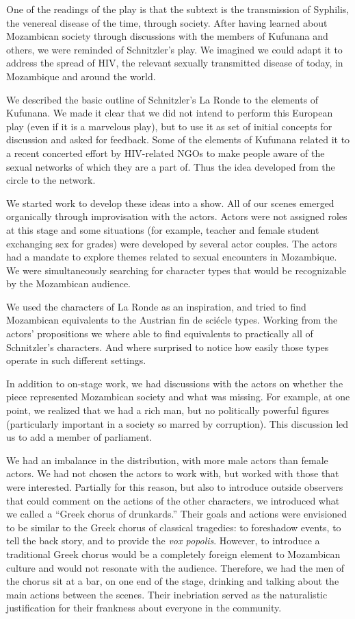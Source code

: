 \documentclass[article,twocolumn]{memoir}
\begin{document}
One of the readings of the play is that the subtext is the transmission of
Syphilis, the venereal disease of the time, through society. After having
learned about Mozambican society through discussions with the members of
Kufunana and others, we were reminded of Schnitzler's play. We imagined we
could adapt it to address the spread of HIV, the relevant sexually transmitted
disease of today, in Mozambique and around the world.

We described the basic outline of Schnitzler's La Ronde to the elements of
Kufunana. We made it clear that we did not intend to perform this European play
(even if it is a marvelous play), but to use it as set of initial concepts for
discussion and asked for feedback. Some of the elements of Kufunana related it
to a recent concerted effort by HIV-related NGOs to make people aware of the
sexual networks of which they are a part of. Thus the idea developed from the
circle to the network.

We started work to develop these ideas into a show. All of our scenes emerged
organically through improvisation with the actors. Actors were not assigned
roles at this stage and some situations (for example, teacher and female student
exchanging sex for grades) were developed by several actor couples. The actors
had a mandate to explore themes related to sexual encounters in Mozambique. We
were simultaneously searching for character types that would be recognizable
by the Mozambican audience.

We used the characters of La Ronde as an inspiration, and tried to find
Mozambican equivalents to the Austrian fin de sci\'{e}cle types. Working from
the actors' propositions we where able to find equivalents to practically all
of Schnitzler's characters. And where surprised to notice how easily those
types operate in such different settings.

In addition to on-stage work, we had discussions with the actors on whether the
piece represented Mozambican society and what was missing. For example, at one
point, we realized that we had a rich man, but no politically powerful figures
(particularly important in a society so marred by corruption). This discussion
led us to add a member of parliament.

We had an imbalance in the distribution, with more male actors than female
actors. We had not chosen the actors to work with, but worked with those that
were interested. Partially for this reason, but also to introduce outside
observers that could comment on the actions of the other characters, we
introduced what we called a ``Greek chorus of drunkards.'' Their goals and
actions were envisioned to be similar to the Greek chorus of classical
tragedies: to foreshadow events, to tell the back story, and to provide the
\textit{vox popolis}. However, to introduce a traditional Greek chorus would be a
completely foreign element to Mozambican culture and would not resonate with
the audience. Therefore, we had the men of the chorus sit at a bar, on one end
of the stage, drinking and talking about the main actions between the scenes.
Their inebriation served as the naturalistic justification for their frankness
about everyone in the community.
\end{document}
